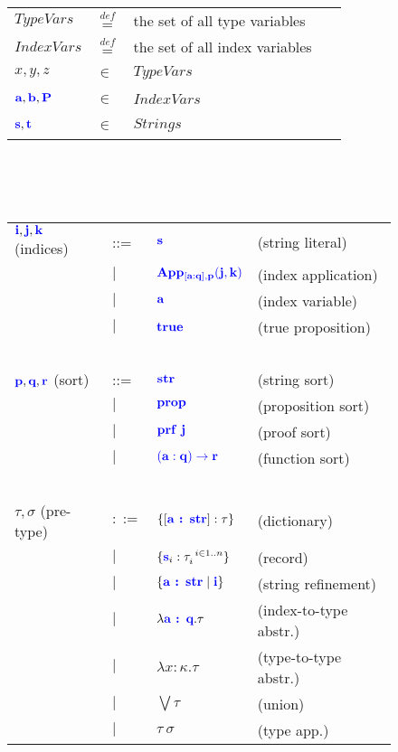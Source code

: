 \documentclass[sigplan,10pt,review,anonymous]{acmart}
\newcommand{\blu}[1]{\textbf{\color{blue}{#1}}}
\newcommand{\blum}[1]{\mathbf{\color{blue}{#1}}}
\newcommand{\defeq}{\overset{\mathit{def}}{=}}
\begin{document}
\begin{figure}
\begin{tabular}{llll}
$\mathit{TypeVars}$ & $\defeq$ & the set of all type variables \\
$\mathit{IndexVars}$ & $\defeq$ & the set of all index variables \\
$x,y,z$ & $\in$ & $\mathit{TypeVars}$ & ~ \\
$\blu{a}, \blu{b}, \blu{P}$ & $\in$ & $\mathit{IndexVars}$ & ~ \\
$\blu{s},\blu{t}$ & $\in$ & $\mathit{Strings}$ & ~ \\
\end{tabular}\\~\\~\\
\begin{tabular}{llll}
$\blu{i},\blu{j},\blu{k}$ (indices) & ::=  & $\blum{s}$ & (string literal) \\
                          & $\mid$ & $\blum{App}_{\blum{[a : q],p}}\blum{(j,k)}$ & (index application) \\
                          & $\mid$ & $\blu{a}$ & (index variable) \\
                          & $\mid$ & $\blu{true}$ & (true proposition) \\
~ & ~ & ~ & ~ \\
$\blu{p},\blu{q},\blu{r}$ (sort) & ::= & $\blum{str}$ & (string sort) \\
                         & $\mid$ & $\blum{prop}$ & (proposition sort) \\
                         & $\mid$ & $\blum{prf~j}$ & (proof sort) \\
                         & $\mid$ & $\blum{(a : q) \to r}$ & (function sort) \\
~ & ~ & ~ & ~ \\
$\tau,\sigma$ (pre-type) & $::=$ & $\{[\blu{a : str}] : \tau \}$ & (dictionary) \\ 
       & $\mid$ & $\{ \blu{s}_i : \tau_i^{~i \in 1..n} \}$ & (record) \\
       & $\mid$ & $\{ \blu{a : str} \mid \blu{i} \}$ & (string refinement) \\
       & $\mid$ & $\lambda \blu{a : q} . \tau$ & (index-to-type abstr.) \\
       & $\mid$ & $\lambda x : \kappa. \tau$ & (type-to-type abstr.) \\
       & $\mid$ & $\bigvee \tau$ & (union) \\
       & $\mid$ & $\tau~\sigma$ & (type app.) \\

\end{tabular}
\end{figure}
\end{document}
